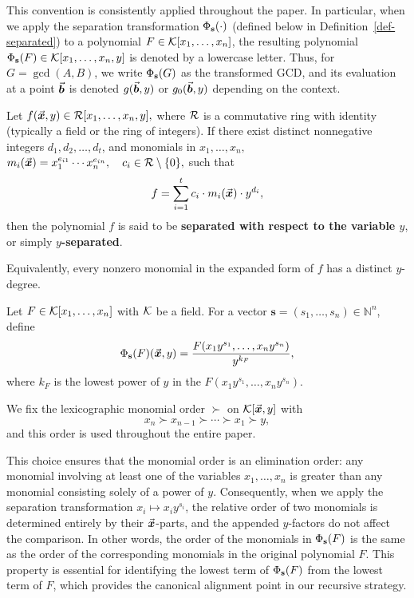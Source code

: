 \documentclass{article}
\numberwithin{equation}{section}
\begin{document}
This convention is consistently applied throughout the paper. In particular, when we apply the separation transformation $\Phi_{\mathbf{s}}(\cdot)$ (defined below in Definition~\ref{def-separated}) to a polynomial $F \in {\mathcal{K}}[x_1,\dots,x_n]$, the resulting polynomial $\Phi_{\mathbf{s}}(F) \in {\mathcal{K}}[x_1,\dots,x_n,y]$ is denoted by a lowercase letter. Thus, for $G = \gcd(A, B)$, we write $\Phi_{\mathbf{s}}(G)$ as the transformed GCD, and its evaluation at a point $\vec{\boldsymbol{b}}$ is denoted $g(\vec{\boldsymbol{b}}, y)$ or $g_0(\vec{\boldsymbol{b}},y)$ depending on the context.


\begin{definition}
Let
\(
f(\vec{\boldsymbol{x}}, y) \in {\mathcal{R}}[x_1, \dots, x_n, y],
\)
where \({\mathcal{R}}\) is a commutative ring with identity (typically a field or the ring of integers). If there exist distinct nonnegative integers \(d_1, d_2, \dots, d_t\), and monomials in \(x_1, \dots, x_n,\)
\(
m_i(\vec{\boldsymbol{x}}) = x_1^{e_{i1}} \cdots x_n^{e_{in}}, \quad c_i \in {\mathcal{R}} \setminus \{0\},
\)
such that
\[
f = \sum_{i=1}^{t} c_i \cdot m_i(\vec{\boldsymbol{x}}) \cdot y^{d_i},
\]
then the polynomial \(f\) is said to be \textbf{separated with respect to the variable \(y\)}, or simply \textbf{$y$-separated}.
\end{definition}

Equivalently, every nonzero monomial in the expanded form of $f$ has a distinct $y$-degree.

\begin{definition}\label{def-separated}
Let $F \in {\mathcal{K}}[x_1, \dots, x_n]$ with ${\mathcal{K}}$ be a field. For a vector $\mathbf{s} = (s_1, \dots, s_n) \in \mathbb{N}^n$, define
\[
\Phi_{\mathbf{s}}(F)(\vec{\boldsymbol{x}}, y)= \frac{F(x_1 y^{s_1}, \dots, x_n y^{s_n})}{y^{k_F}},
\]
where $k_F$ is the lowest power of $y$ in the $F(x_1 y^{s_1}, \dots, x_n y^{s_n})$.
\end{definition}


We fix the lexicographic monomial order $\succ$ on ${\mathcal{K}}[\vec{\boldsymbol{x}}, y]$ with
\[
x_n \succ x_{n-1} \succ \cdots \succ x_1 \succ y,
\]
and this order is used throughout the entire paper. 


This choice ensures that the monomial order is an elimination order: any monomial involving at least one of the variables $x_1,\dots,x_n$ is greater than any monomial consisting solely of a power of $y$. Consequently, when we apply the separation transformation $x_i \mapsto x_i y^{s_i}$, the relative order of two monomials is determined entirely by their $\vec{\boldsymbol{x}}$-parts, and the appended $y$-factors do not affect the comparison. In other words, the order of the monomials in $\Phi_{\mathbf{s}}(F)$ is the same as the order of the corresponding monomials in the original polynomial $F$. This property is essential for identifying the lowest term of $\Phi_{\mathbf{s}}(F)$ from the lowest term of $F$, which provides the canonical alignment point in our recursive strategy.
\end{document}
